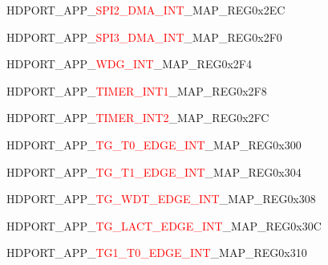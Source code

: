 \vspace{-3em}
\begin{register}{H}{DPORT\_APP\_\textcolor{red}{SPI2\_DMA\_INT}\_MAP\_REG}{0x2EC}\label{regdesc:APPSPI2DMAINTMAPREG}
\end{register}
\vspace{-3em}
\begin{register}{H}{DPORT\_APP\_\textcolor{red}{SPI3\_DMA\_INT}\_MAP\_REG}{0x2F0}\label{regdesc:APPSPI3DMAINTMAPREG}
\end{register}
\vspace{-3em}
\begin{register}{H}{DPORT\_APP\_\textcolor{red}{WDG\_INT}\_MAP\_REG}{0x2F4}\label{regdesc:APPWDGINTMAPREG}
\end{register}
\vspace{-3em}
\begin{register}{H}{DPORT\_APP\_\textcolor{red}{TIMER\_INT1}\_MAP\_REG}{0x2F8}\label{regdesc:APPTIMERINT1MAPREG}
\end{register}
\vspace{-3em}
\begin{register}{H}{DPORT\_APP\_\textcolor{red}{TIMER\_INT2}\_MAP\_REG}{0x2FC}\label{regdesc:APPTIMERINT2MAPREG}
\end{register}
\vspace{-3em}
\begin{register}{H}{DPORT\_APP\_\textcolor{red}{TG\_T0\_EDGE\_INT}\_MAP\_REG}{0x300}\label{regdesc:APPTGT0EDGEINTMAPREG}
\end{register}
\vspace{-3em}
\begin{register}{H}{DPORT\_APP\_\textcolor{red}{TG\_T1\_EDGE\_INT}\_MAP\_REG}{0x304}\label{regdesc:APPTGT1EDGEINTMAPREG}
\end{register}
\vspace{-3em}
\begin{register}{H}{DPORT\_APP\_\textcolor{red}{TG\_WDT\_EDGE\_INT}\_MAP\_REG}{0x308}\label{regdesc:APPTGWDTEDGEINTMAPREG}
\end{register}
\vspace{-3em}
\begin{register}{H}{DPORT\_APP\_\textcolor{red}{TG\_LACT\_EDGE\_INT}\_MAP\_REG}{0x30C}\label{regdesc:APPTGLACTEDGEINTMAPREG}
\end{register}
\vspace{-3em}
\begin{register}{H}{DPORT\_APP\_\textcolor{red}{TG1\_T0\_EDGE\_INT}\_MAP\_REG}{0x310}\label{regdesc:APPTG1T0EDGEINTMAPREG}
\end{register}

